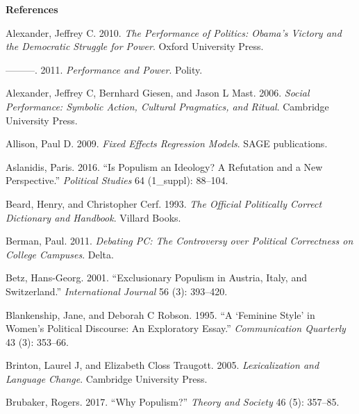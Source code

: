 \documentclass[smallextended]{svjour3}       %
\newlength{\cslhangindent}
\newlength{\cslentryspacingunit} %
\newenvironment{CSLReferences}[2] %
 {%
  \setlength{\parindent}{0pt}
  \ifodd #1
  \let\oldpar\par
  \def\par{\hangindent=\cslhangindent\oldpar}
  \fi
  \setlength{\parskip}{#2\cslentryspacingunit}
 }%
 {}
\begin{document}
\newpage

\textbf{References}

\hypertarget{refs}{}
\begin{CSLReferences}{1}{0}
\leavevmode{}%
Alexander, Jeffrey C. 2010. \emph{The Performance of Politics: Obama's
Victory and the Democratic Struggle for Power}. Oxford University Press.

\leavevmode{}%
---------. 2011. \emph{Performance and Power}. Polity.

\leavevmode{}%
Alexander, Jeffrey C, Bernhard Giesen, and Jason L Mast. 2006.
\emph{Social Performance: Symbolic Action, Cultural Pragmatics, and
Ritual}. Cambridge University Press.

\leavevmode{}%
Allison, Paul D. 2009. \emph{Fixed Effects Regression Models}. SAGE
publications.

\leavevmode{}%
Aslanidis, Paris. 2016. {``Is Populism an Ideology? A Refutation and a
New Perspective.''} \emph{Political Studies} 64 (1\_suppl): 88--104.

\leavevmode{}%
Beard, Henry, and Christopher Cerf. 1993. \emph{The Official Politically
Correct Dictionary and Handbook}. Villard Books.

\leavevmode{}%
Berman, Paul. 2011. \emph{Debating PC: The Controversy over Political
Correctness on College Campuses}. Delta.

\leavevmode{}%
Betz, Hans-Georg. 2001. {``Exclusionary Populism in Austria, Italy, and
Switzerland.''} \emph{International Journal} 56 (3): 393--420.

\leavevmode{}%
Blankenship, Jane, and Deborah C Robson. 1995. {``A {`Feminine Style'}
in Women's Political Discourse: An Exploratory Essay.''}
\emph{Communication Quarterly} 43 (3): 353--66.

\leavevmode{}%
Brinton, Laurel J, and Elizabeth Closs Traugott. 2005.
\emph{Lexicalization and Language Change}. Cambridge University Press.

\leavevmode{}%
Brubaker, Rogers. 2017. {``Why Populism?''} \emph{Theory and Society} 46
(5): 357--85.


\end{CSLReferences}
\end{document}
